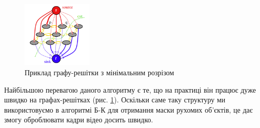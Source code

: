 \begin{figure}[h]
    \centering
    \includegraphics[width=0.3\textwidth]{images/graph_cut}
    \caption{Приклад графу-решітки з мінімальним розрізом \cite{boykov_kolmogorov}
        \label{fig:graph_lattice}
    }
\end{figure}
Найбільшою перевагою даного алгоритму є те, що на практиці він працює дуже швидко на графах-решітках
(рис. \ref{fig:graph_lattice}).
Оскільки саме таку структуру ми використовуємо в алгоритмі Б-К для отримання маски рухомих
об'єктів, це дає змогу оброблювати кадри відео досить швидко.
